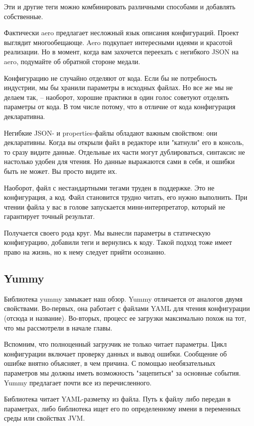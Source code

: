 Эти и другие теги можно комбинировать различными способами и добавлять
собственные.

Фактически aero предлагает несложный язык описания конфигураций. Проект выглядит
многообещающе. Aero подкупает интересными идеями и красотой реализации. Но в
момент, когда вам захочется переехать с негибкого JSON на aero, подумайте об
обратной стороне медали.

Конфигурацию не случайно отделяют от кода. Если бы не потребность индустрии, мы
бы хранили параметры в исходных файлах. Но все же мы не делаем так, -- наоборот,
хорошие практики в один голос советуют отделять параметры от кода. В том числе
потому, что в отличие от кода конфигурация декларативна.

Негибкие JSON- и properties-файлы обладают важным свойством: они
декларативны. Когда вы открыли файл в редакторе или "катнули" его в консоль, то
сразу видите данные. Отдельные их части могут дублироваться, синтаксис не
настолько удобен для чтения. Но данные выражаются сами в себя, и ошибки быть не
может. Вы просто видите их.

Наоборот, файл с нестандартными тегами труден в поддержке. Это не конфигурация,
а код. Файл становится трудно читать, его нужно выполнить. При чтении файла у
вас в голове запускается мини-интерпретатор, который не гарантирует точный
результат.

Получается своего рода круг. Мы вынесли параметры в статическую конфигурацию,
добавили теги и вернулись к коду. Такой подход тоже имеет право на жизнь, но к
нему следует прийти осознанно.

\subsection{Yummy}

Библиотека yummy замыкает наш обзор. Yummy отличается от аналогов двумя
свойствами. Во-первых, она работает с файлами YAML для чтения конфигурации
(отсюда и название). Во-вторых, процесс ее загрузки максимально похож на тот,
что мы рассмотрели в начале главы.

Вспомним, что полноценный загрузчик не только читает параметры. Цикл
конфигурации включает проверку данных и вывод ошибки. Сообщение об ошибке внятно
объясняет, в чем причина. С помощью необязательных параметров мы должны иметь
возможность "зацепиться" за основные события. Yummy предлагает почти все из
перечисленного.

Библиотека читает YAML-разметку из файла. Путь к файлу либо передан в
параметрах, либо библиотека ищет его по определенному имени в переменных среды
или свойствах JVM.

